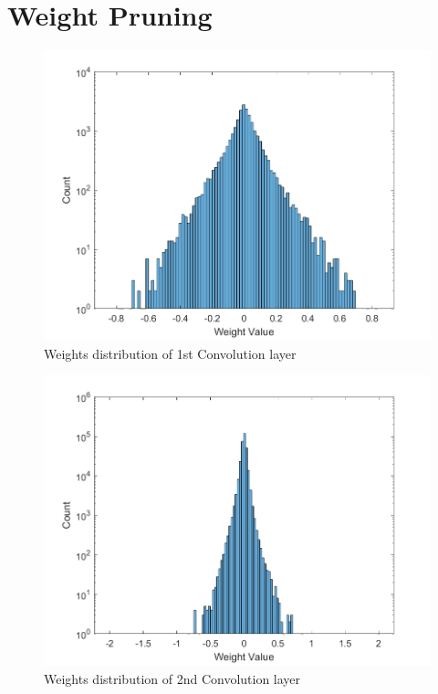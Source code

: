 \section{Weight Pruning}

\begin{figure} [H]
	\centering
	\includegraphics[scale=0.9]{Images/Weights-distributions/original/weight-distribution-conv1.png}
	\decoRule
	\caption[Weights distribution of 1st Convolution layer]{Weights distribution of 1st Convolution layer}
	\label{fig:weight-distribution-conv1}
\end{figure}

\begin{figure} [H]
	\centering
	\includegraphics[scale=0.9]{Images/Weights-distributions/original/weight-distribution-conv2.png}
	\decoRule
	\caption[Weights distribution of 2nd Convolution layer]{Weights distribution of 2nd Convolution layer}
	\label{fig:weight-distribution-conv2}
\end{figure}

